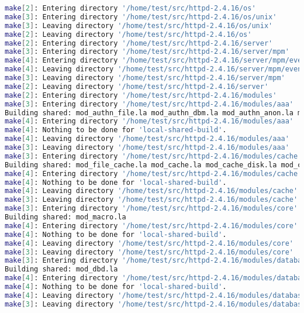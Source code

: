 \begin{lstlisting}[language=bash]
make[2]: Entering directory '/home/test/src/httpd-2.4.16/os'
make[3]: Entering directory '/home/test/src/httpd-2.4.16/os/unix'
make[3]: Leaving directory '/home/test/src/httpd-2.4.16/os/unix'
make[2]: Leaving directory '/home/test/src/httpd-2.4.16/os'
make[2]: Entering directory '/home/test/src/httpd-2.4.16/server'
make[3]: Entering directory '/home/test/src/httpd-2.4.16/server/mpm'
make[4]: Entering directory '/home/test/src/httpd-2.4.16/server/mpm/event'
make[4]: Leaving directory '/home/test/src/httpd-2.4.16/server/mpm/event'
make[3]: Leaving directory '/home/test/src/httpd-2.4.16/server/mpm'
make[2]: Leaving directory '/home/test/src/httpd-2.4.16/server'
make[2]: Entering directory '/home/test/src/httpd-2.4.16/modules'
make[3]: Entering directory '/home/test/src/httpd-2.4.16/modules/aaa'
Building shared: mod_authn_file.la mod_authn_dbm.la mod_authn_anon.la mod_authn_dbd.la mod_authn_socache.la mod_authn_core.la mod_authz_host.la mod_authz_groupfile.la mod_authz_user.la mod_authz_dbm.la mod_authz_owner.la mod_authz_dbd.la mod_authz_core.la mod_access_compat.la mod_auth_basic.la mod_auth_form.la mod_auth_digest.la mod_allowmethods.la
make[4]: Entering directory '/home/test/src/httpd-2.4.16/modules/aaa'
make[4]: Nothing to be done for 'local-shared-build'.
make[4]: Leaving directory '/home/test/src/httpd-2.4.16/modules/aaa'
make[3]: Leaving directory '/home/test/src/httpd-2.4.16/modules/aaa'
make[3]: Entering directory '/home/test/src/httpd-2.4.16/modules/cache'
Building shared: mod_file_cache.la mod_cache.la mod_cache_disk.la mod_cache_socache.la mod_socache_shmcb.la mod_socache_dbm.la mod_socache_memcache.la
make[4]: Entering directory '/home/test/src/httpd-2.4.16/modules/cache'
make[4]: Nothing to be done for 'local-shared-build'.
make[4]: Leaving directory '/home/test/src/httpd-2.4.16/modules/cache'
make[3]: Leaving directory '/home/test/src/httpd-2.4.16/modules/cache'
make[3]: Entering directory '/home/test/src/httpd-2.4.16/modules/core'
Building shared: mod_macro.la
make[4]: Entering directory '/home/test/src/httpd-2.4.16/modules/core'
make[4]: Nothing to be done for 'local-shared-build'.
make[4]: Leaving directory '/home/test/src/httpd-2.4.16/modules/core'
make[3]: Leaving directory '/home/test/src/httpd-2.4.16/modules/core'
make[3]: Entering directory '/home/test/src/httpd-2.4.16/modules/database'
Building shared: mod_dbd.la
make[4]: Entering directory '/home/test/src/httpd-2.4.16/modules/database'
make[4]: Nothing to be done for 'local-shared-build'.
make[4]: Leaving directory '/home/test/src/httpd-2.4.16/modules/database'
make[3]: Leaving directory '/home/test/src/httpd-2.4.16/modules/database'

\end{lstlisting}
